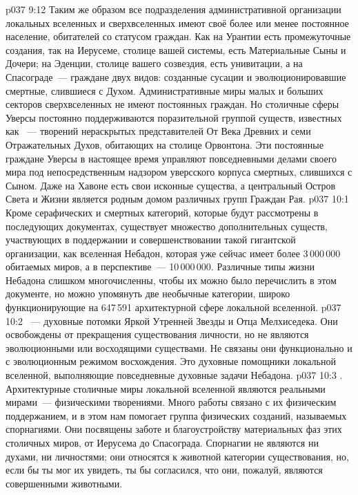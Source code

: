 \vs p037 9:12 \pc Таким же образом все подразделения административной организации локальных вселенных и сверхвселенных имеют своё более или менее постоянное население, обитателей со статусом граждан. Как на Урантии есть промежуточные создания, так на Иерусеме, столице вашей системы, есть Материальные Сыны и Дочери; на Эденции, столице вашего созвездия, есть унивитации, а на Спасограде~--- граждане двух видов: созданные сусации и эволюционировавшие смертные, слившиеся с Духом. Административные миры малых и больших секторов сверхвселенных не имеют постоянных граждан. Но столичные сферы Уверсы постоянно поддерживаются поразительной группой существ, известных как ~--- творений нераскрытых представителей От Века Древних и семи Отражательных Духов, обитающих на столице Орвонтона. Эти постоянные граждане Уверсы в настоящее время управляют повседневными делами своего мира под непосредственным надзором уверсского корпуса смертных, слившихся с Сыном. Даже на Хавоне есть свои исконные существа, а центральный Остров Света и Жизни является родным домом различных групп Граждан Рая.
\vs p037 10:1 Кроме серафических и смертных категорий, которые будут рассмотрены в последующих документах, существует множество дополнительных существ, участвующих в поддержании и совершенствовании такой гигантской организации, как вселенная Небадон, которая уже сейчас имеет более 3\,000\,000 обитаемых миров, а в перспективе~--- 10\,000\,000. Различные типы жизни Небадона слишком многочисленны, чтобы их можно было перечислить в этом документе, но можно упомянуть две необычные категории, широко функционирующие на 647\,591 архитектурной сфере локальной вселенной.
\vs p037 10:2 \pc {}~--- духовные потомки Яркой Утренней Звезды и Отца Мелхиседека. Они освобождены от прекращения существования личности, но не являются эволюционными или восходящими существами. Не связаны они функционально и с эволюционным режимом восхождения. Это духовные помощники локальной вселенной, выполняющие повседневные духовные задачи Небадона.
\vs p037 10:3 \pc {}. Архитектурные столичные миры локальной вселенной являются реальными мирами~--- физическими творениями. Много работы связано с их физическим поддержанием, и в этом нам помогает группа физических созданий, называемых спорнагиями. Они посвящены заботе и благоустройству материальных фаз этих столичных миров, от Иерусема до Спасограда. Спорнагии не являются ни духами, ни личностями; они относятся к животной категории существования, но, если бы ты мог их увидеть, ты бы согласился, что они, пожалуй, являются совершенными животными.
